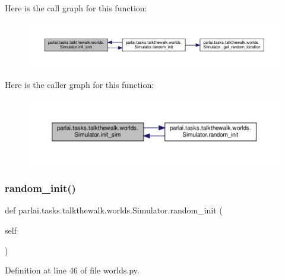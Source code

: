 Here is the call graph for this function\+:
\nopagebreak
\begin{figure}[H]
\begin{center}
\leavevmode
\includegraphics[width=350pt]{classparlai_1_1tasks_1_1talkthewalk_1_1worlds_1_1Simulator_a0bd93cb7b6958af1795e6c0adf47cb4d_cgraph}
\end{center}
\end{figure}
Here is the caller graph for this function\+:
\nopagebreak
\begin{figure}[H]
\begin{center}
\leavevmode
\includegraphics[width=350pt]{classparlai_1_1tasks_1_1talkthewalk_1_1worlds_1_1Simulator_a0bd93cb7b6958af1795e6c0adf47cb4d_icgraph}
\end{center}
\end{figure}
\mbox{\label{classparlai_1_1tasks_1_1talkthewalk_1_1worlds_1_1Simulator_adde735badb8bd967efbc8e6a71378bac}} 
\subsubsection{\texorpdfstring{random\+\_\+init()}{random\_init()}}
{\footnotesize\ttfamily def parlai.\+tasks.\+talkthewalk.\+worlds.\+Simulator.\+random\+\_\+init (\begin{DoxyParamCaption}\item[{}]{self }\end{DoxyParamCaption})}



Definition at line 46 of file worlds.\+py.



